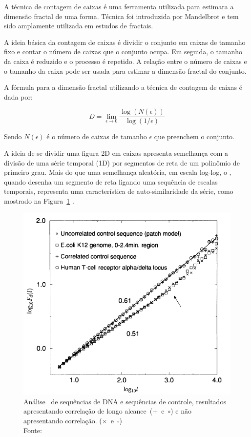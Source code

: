 A técnica de contagem de caixas é uma ferramenta utilizada para estimara a dimensão fractal de uma forma. Técnica foi introduzida por Mandelbrot e tem sido amplamente utilizada em estudos de fractais.

A ideia básica da contagem de caixas é dividir o conjunto em caixas de tamanho fixo e contar o número de caixas que o conjunto ocupa. Em seguida, o tamanho da caixa é reduzido e o processo é repetido. A relação entre o número de caixas e o tamanho da caixa pode ser usada para estimar a dimensão fractal do conjunto.

A fórmula para a dimensão fractal utilizando a técnica de contagem de caixas é dada por:

\begin{equation}\label{eq:Hausdorff}
  D = \lim_{\epsilon \to 0} \frac{\log(N(\epsilon))}{\log(1/\epsilon)}
\end{equation}


Sendo $N(\epsilon)$ é o número de caixas de tamanho $\epsilon$ que preenchem o conjunto.


A ideia de se dividir uma figura 2D em caixas apresenta semelhança com a divisão de uma série temporal (1D) por segmentos de reta de um polinômio de primeiro grau. Mais do que uma semelhança aleatória, em escala log-log, o \dfa, quando desenha um segmento de reta ligando uma sequência de escalas temporais, representa uma característica de auto-similaridade da série, como mostrado na Figura~\ref{fig:peng01} \cite{Peng1994}.

\begin{figure}[!htb]
	\centering
	\includegraphics[width=.8\textwidth]{../Figures/peng.png}
  \captionsetup{justification=centering}
  \caption{Análise \dfa~de sequências de DNA e sequências de controle, resultados apresentando correlação de longo alcance~($+$~e~$\circ$) e não apresentando correlação. ($\times$~e~$\square$)\\Fonte: \cite{Peng1994}}
\label{fig:peng01}
\end{figure}

